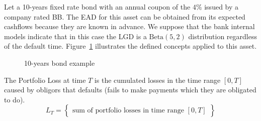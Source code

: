 \documentclass[11pt,fleqn]{book} %
\begin{document}
\begin{example}
	Let a 10-years fixed rate bond with an annual coupon of the
	$4\%$ issued by a company rated BB\@.
	The EAD for this asset can be obtained from its expected cashflows 
	because they are known in advance. We suppose that the bank 
	internal models indicate that in this case the LGD is a 
	$\text{Beta}(5,2)$ distribution regardless of the default time.
	Figure~\ref{figure:bond} illustrates the defined concepts applied 
	to this asset.
	\begin{figure}[!ht]
		\centering
		\caption{10-years bond example}
		\label{figure:bond} 
	\end{figure}
\end{example}

\begin{definition}
	The Portfolio Loss at time $T$ is the cumulated losses in the time 
	range $[0,T]$ caused by obligors that defaults (fails to make 
	payments which they are obligated to do).
	\begin{displaymath}
		L_T = \left\{
		\begin{array}{c}
			\text{sum of portfolio losses in time range $[0,T]$}
		\end{array}
		\right\}
	\end{displaymath}
\end{definition}
\end{document}
